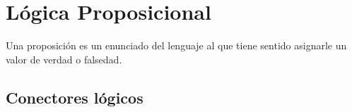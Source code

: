 \documentclass[a4paper, twoside]{article}
\newcommand{\rutapaquetes}{./paquetes-apunte}
\begin{document}
\maketitle

\tableofcontents


\section{Lógica Proposicional}
Una proposición es un enunciado del lenguaje al que tiene sentido asignarle un valor de verdad o falsedad.

\subsection{Conectores lógicos}
\end{document}
